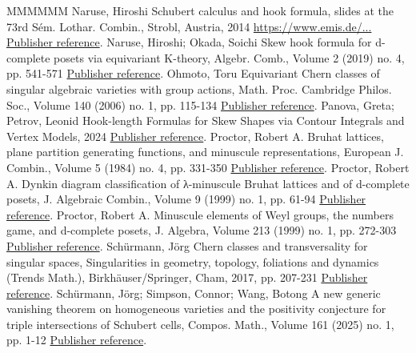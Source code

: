 \documentclass[11pt]{article}
\theoremstyle{definition}
\numberwithin{equation}{section}
\begin{document}
\begin{thebibliography}{MMMMMM}
 Naruse, Hiroshi Schubert calculus and hook formula, slides at the 73rd Sém. Lothar. Combin., Strobl, Austria, 2014 \url{https://www.emis.de/...} \href{https://alco.centre-mersenne.org/articles/10.5802/alco.428/#naruse2014schubert}{Publisher reference}.
 Naruse, Hiroshi; Okada, Soichi Skew hook formula for d-complete posets via equivariant K-theory, Algebr. Comb., Volume 2 (2019) no. 4, pp. 541-571 \href{https://alco.centre-mersenne.org/articles/10.5802/alco.428/#naruse2019skew}{Publisher reference}.
 Ohmoto, Toru Equivariant Chern classes of singular algebraic varieties with group actions, Math. Proc. Cambridge Philos. Soc., Volume 140 (2006) no. 1, pp. 115-134 \href{https://alco.centre-mersenne.org/articles/10.5802/alco.428/#ohmoto:eqcsm}{Publisher reference}.
 Panova, Greta; Petrov, Leonid Hook-length Formulas for Skew Shapes via Contour Integrals and Vertex Models, 2024 \href{https://alco.centre-mersenne.org/articles/10.5802/alco.428/#panova.petrov:hook}{Publisher reference}.
 Proctor, Robert A. Bruhat lattices, plane partition generating functions, and minuscule representations, European J. Combin., Volume 5 (1984) no. 4, pp. 331-350 \href{https://alco.centre-mersenne.org/articles/10.5802/alco.428/#proctor:bruhat}{Publisher reference}.
 Proctor, Robert A. Dynkin diagram classification of λ-minuscule Bruhat lattices and of d-complete posets, J. Algebraic Combin., Volume 9 (1999) no. 1, pp. 61-94 \href{https://alco.centre-mersenne.org/articles/10.5802/alco.428/#proctor:dynkin}{Publisher reference}.
 Proctor, Robert A. Minuscule elements of Weyl groups, the numbers game, and d-complete posets, J. Algebra, Volume 213 (1999) no. 1, pp. 272-303 \href{https://alco.centre-mersenne.org/articles/10.5802/alco.428/#proctor:minuscule}{Publisher reference}.
 Schürmann, Jörg Chern classes and transversality for singular spaces, Singularities in geometry, topology, foliations and dynamics (Trends Math.), Birkhäuser/Springer, Cham, 2017, pp. 207-231 \href{https://alco.centre-mersenne.org/articles/10.5802/alco.428/#schurmann:transversality}{Publisher reference}.
 Schürmann, Jörg; Simpson, Connor; Wang, Botong A new generic vanishing theorem on homogeneous varieties and the positivity conjecture for triple intersections of Schubert cells, Compos. Math., Volume 161 (2025) no. 1, pp. 1-12 \href{https://alco.centre-mersenne.org/articles/10.5802/alco.428/#schurmann.simpson.wang}{Publisher reference}.

\end{thebibliography}
\end{document}
